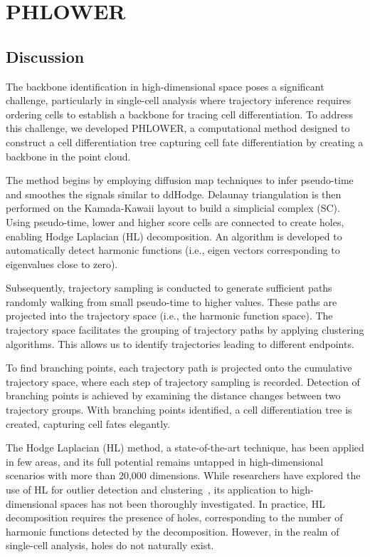 \section{PHLOWER}
\subsection{Discussion}
The backbone identification in high-dimensional space poses a significant challenge, particularly in single-cell analysis where trajectory inference requires ordering cells to establish a backbone for tracing cell differentiation. To address this challenge, we developed PHLOWER, a computational method designed to construct a cell differentiation tree capturing cell fate differentiation by creating a backbone in the point cloud.

The method begins by employing diffusion map techniques to infer pseudo-time and smoothes the signals similar to ddHodge. Delaunay triangulation is then performed on the Kamada-Kawaii layout to build a simplicial complex (SC). Using pseudo-time, lower and higher score cells are connected to create holes, enabling Hodge Laplacian (HL) decomposition. An algorithm is developed to automatically detect harmonic functions (i.e., eigen vectors corresponding to eigenvalues close to zero).

Subsequently, trajectory sampling is conducted to generate sufficient paths randomly walking from small pseudo-time to higher values. These paths are projected into the trajectory space (i.e., the harmonic function space). The trajectory space facilitates the grouping of trajectory paths by applying clustering algorithms. This allows us to identify trajectories leading to different endpoints.

To find branching points, each trajectory path is projected onto the cumulative trajectory space, where each step of trajectory sampling is recorded. Detection of branching points is achieved by examining the distance changes between two trajectory groups. With branching points identified, a cell differentiation tree is created, capturing cell fates elegantly.


The Hodge Laplacian (HL) method, a state-of-the-art technique, has been applied in few areas, and its full potential remains untapped in high-dimensional scenarios with more than 20,000 dimensions. While researchers have explored the use of HL for outlier detection and clustering~\citep{frantzen2021outlier}, its application to high-dimensional spaces has not been thoroughly investigated. In practice, HL decomposition requires the presence of holes, corresponding to the number of harmonic functions detected by the decomposition. However, in the realm of single-cell analysis, holes do not naturally exist.

